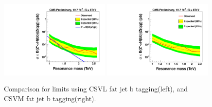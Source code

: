 \begin{figure}[h!tpb]
\begin{center}
\includegraphics[width=0.49\textwidth]{HbbZqqfigs/Limits/brazilianFlag_Hbb_HbbCombine.pdf}
\includegraphics[width=0.49\textwidth]{HbbZqqfigs/CSVMLimits/brazilianFlag_WZ_high_purityHbbCombineCSVM.pdf}
\end{center}
\caption{
Comparison for limits using CSVL fat jet b tagging(left), and CSVM fat jet b tagging(right). 
}
\label{fig:HbbLimitsCompare}
\end{figure}


\clearpage
